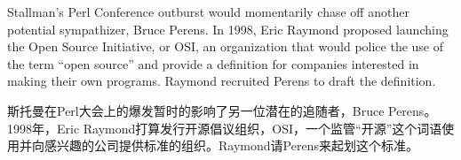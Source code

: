 \ifdefined\eng
Stallman's Perl Conference outburst would momentarily chase off another potential sympathizer, Bruce Perens. In 1998, Eric Raymond proposed launching the Open Source Initiative, or OSI, an organization that would police the use of the term ``open source'' and provide a definition for companies interested in making their own programs. Raymond recruited Perens to draft the definition.\endnote{}
\fi

\ifdefined\chs
斯托曼在Perl大会上的爆发暂时的影响了另一位潜在的追随者，Bruce Perens。1998年，Eric Raymond打算发行开源倡议组织，OSI，一个监管“开源”这个词语使用并向感兴趣的公司提供标准的组织。Raymond请Perens来起划这个标准。\endnote{}
\fi







